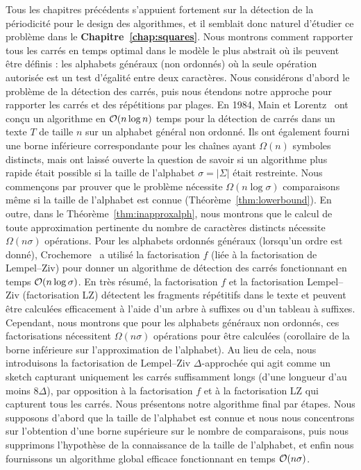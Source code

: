 Tous les chapitres précédents s'appuient fortement sur la détection de la périodicité pour le design des algorithmes, et il semblait donc naturel d'étudier ce problème dans le \textbf{Chapitre~\ref{chap:squares}}. Nous montrons comment rapporter tous les carrés en temps optimal dans le modèle le plus abstrait où ils peuvent être définis : les alphabets généraux (non ordonnés) où la seule opération autorisée est un test d'égalité entre deux caractères. 
Nous considérons d'abord le problème de la détection des carrés, puis nous étendons notre approche pour rapporter les carrés et des répétitions par plages.
% 
En 1984, Main et Lorentz~\cite{Main1984} ont conçu un algorithme en $\mathcal{O}(n\log n)$ temps pour la détection de carrés dans un texte $T$ de taille $n$ sur un alphabet général non ordonné. Ils ont également fourni une borne inférieure correspondante pour les chaînes ayant $\Omega(n)$ symboles distincts, mais ont laissé ouverte la question de savoir si un algorithme plus rapide était possible si la taille de l'alphabet $\sigma=|\Sigma|$ était restreinte.
% 
Nous commençons par prouver que le problème nécessite $\Omega(n \log \sigma)$ comparaisons même si la taille de l'alphabet est connue (Théorème~\ref{thm:lowerbound}). En outre, dans le Théorème~\ref{thm:inapproxalph}, nous montrons que le calcul de toute approximation pertinente du nombre de caractères distincts nécessite $\Omega(n\sigma)$ opérations.
%
Pour les alphabets ordonnés généraux (lorsqu'un ordre est donné), Crochemore~\cite{Crochemore1986} a utilisé la factorisation $f$ (liée à la  factorisation de Lempel--Ziv) pour donner un algorithme de détection des carrés fonctionnant en temps $\mathcal{O}(n\log \sigma)$. En très résumé, la factorisation $f$ et la factorisation Lempel--Ziv (factorisation LZ) détectent les fragments répétitifs dans le texte et peuvent être calculées efficacement à l'aide d'un arbre à suffixes ou d'un tableau à suffixes. Cependant, nous montrons que pour les alphabets généraux non ordonnés, ces factorisations nécessitent $\Omega(n\sigma)$ opérations pour être calculées (corollaire de la borne inférieure sur l'approximation de l'alphabet). 
% 
Au lieu de cela, nous introduisons la factorisation de Lempel--Ziv $\Delta$-approchée qui agit comme un sketch capturant uniquement les carrés suffisamment longs (d'une longueur d'au moins $8\Delta$), par opposition à la factorisation $f$ et à la factorisation LZ qui capturent tous les carrés.
Nous présentons notre algorithme final par étapes. Nous supposons d'abord que la taille de l'alphabet est connue et nous nous concentrons sur l'obtention d'une borne supérieure sur le nombre de comparaisons, puis nous supprimons l'hypothèse de la connaissance de la taille de l'alphabet, et enfin nous fournissons un algorithme global efficace fonctionnant en temps $\mathcal{O}(n\sigma)$.\\


